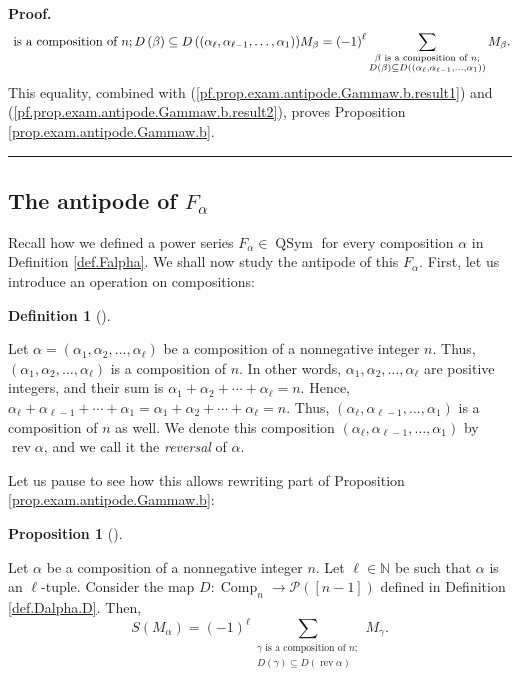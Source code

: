 \documentclass[numbers=enddot,12pt,final,onecolumn,notitlepage,abstracton]{scrartcl}
\theoremstyle{definition}
\newtheorem{prop}[theo]{Proposition}
\newenvironment{proposition}[1][]
{\begin{prop}[#1]\begin{leftbar}}
{\end{leftbar}\end{prop}}
\newtheorem{defi}[theo]{Definition}
\newenvironment{definition}[1][]
{\begin{defi}[#1]\begin{leftbar}}
{\end{leftbar}\end{defi}}
\newenvironment{proof}[1][Proof]{\noindent\textbf{#1.} }{\ \rule{0.5em}{0.5em}}
\let\sumnonlimits\sum
\renewcommand{\sum}{\sumnonlimits\limits}
\newenvironment{verlong}{}{}
\begin{document}
\begin{verlong}
\begin{footnotesize}
\begin{proof}
\[{{{\text{ is a composition of }n;\\D\left(  \beta\right)  \subseteq D\left(
\left(  \alpha_{\ell},\alpha_{\ell-1},\ldots,\alpha_{1}\right)  \right)
}}M_{\beta}}=\left(  -1\right)  ^{\ell}\sum_{\substack{\beta\text{ is a
composition of }n;\\D\left(  \beta\right)  \subseteq D\left(  \left(
\alpha_{\ell},\alpha_{\ell-1},\ldots,\alpha_{1}\right)  \right)  }}M_{\beta}.
\]
This equality, combined with (\ref{pf.prop.exam.antipode.Gammaw.b.result1})
and (\ref{pf.prop.exam.antipode.Gammaw.b.result2}), proves Proposition
\ref{prop.exam.antipode.Gammaw.b}.
\end{proof}

\subsection{The antipode of $F_{\alpha}$}

Recall how we defined a power series $F_{\alpha}\in\operatorname*{QSym}$ for
every composition $\alpha$ in Definition \ref{def.Falpha}. We shall now study
the antipode of this $F_{\alpha}$. First, let us introduce an operation on compositions:

\begin{definition}
\label{def.rev}Let $\alpha=\left(  \alpha_{1},\alpha_{2},\ldots,\alpha_{\ell
}\right)  $ be a composition of a nonnegative integer $n$. Thus, $\left(
\alpha_{1},\alpha_{2},\ldots,\alpha_{\ell}\right)  $ is a composition of $n$.
In other words, $\alpha_{1},\alpha_{2},\ldots,\alpha_{\ell}$ are positive
integers, and their sum is $\alpha_{1}+\alpha_{2}+\cdots+\alpha_{\ell}=n$.
Hence, $\alpha_{\ell}+\alpha_{\ell-1}+\cdots+\alpha_{1}=\alpha_{1}+\alpha
_{2}+\cdots+\alpha_{\ell}=n$. Thus, $\left(  \alpha_{\ell},\alpha_{\ell
-1},\ldots,\alpha_{1}\right)  $ is a composition of $n$ as well. We denote
this composition $\left(  \alpha_{\ell},\alpha_{\ell-1},\ldots,\alpha
_{1}\right)  $ by $\operatorname*{rev}\alpha$, and we call it the
\textit{reversal} of $\alpha$.
\end{definition}

Let us pause to see how this allows rewriting part of Proposition
\ref{prop.exam.antipode.Gammaw.b}:

\begin{proposition}
\label{prop.exam.antipode.Gammaw.b.rev}Let $\alpha$ be a composition of a
nonnegative integer $n$. Let $\ell\in\mathbb{N}$ be such that $\alpha$ is an
$\ell$-tuple. Consider the map $D:\operatorname*{Comp}\nolimits_{n}%
\rightarrow\mathcal{P}\left(  \left[  n-1\right]  \right)  $ defined in
Definition \ref{def.Dalpha.D}. Then,%
\[
S\left(  M_{\alpha}\right)  =\left(  -1\right)  ^{\ell}\sum_{\substack{\gamma
\text{ is a composition of }n;\\D\left(  \gamma\right)  \subseteq D\left(
\operatorname*{rev}\alpha\right)  }}M_{\gamma}.
\]


\end{proposition}
\end{footnotesize}
\end{verlong}
\end{document}
